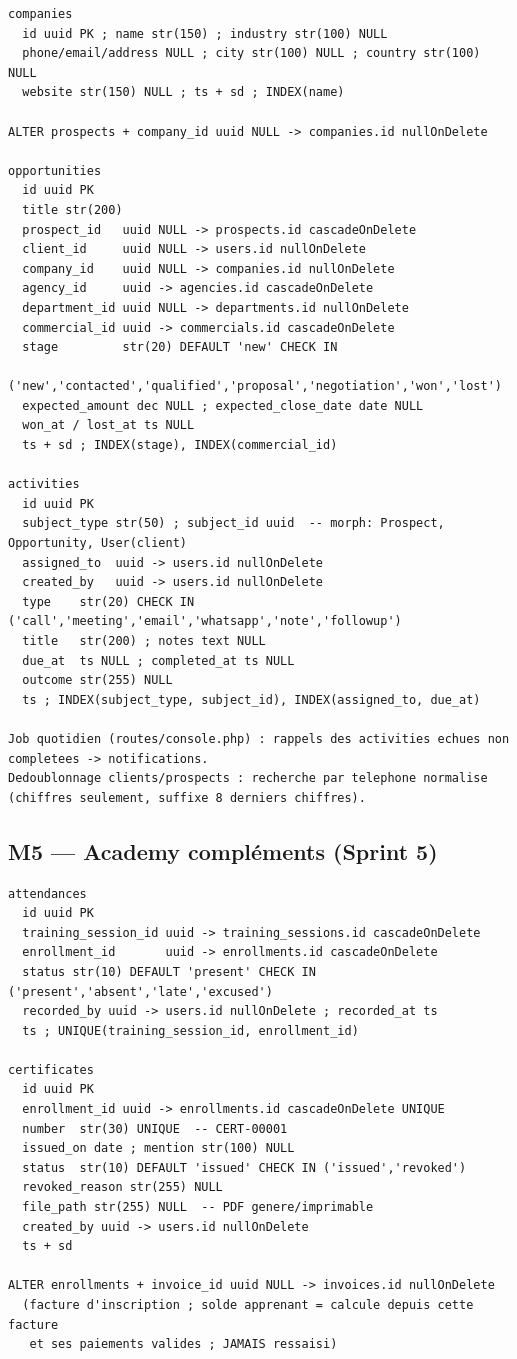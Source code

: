 \documentclass[11pt,a4paper]{article}
\begin{document}
\begin{lstlisting}
companies
  id uuid PK ; name str(150) ; industry str(100) NULL
  phone/email/address NULL ; city str(100) NULL ; country str(100) NULL
  website str(150) NULL ; ts + sd ; INDEX(name)

ALTER prospects + company_id uuid NULL -> companies.id nullOnDelete

opportunities
  id uuid PK
  title str(200)
  prospect_id   uuid NULL -> prospects.id cascadeOnDelete
  client_id     uuid NULL -> users.id nullOnDelete
  company_id    uuid NULL -> companies.id nullOnDelete
  agency_id     uuid -> agencies.id cascadeOnDelete
  department_id uuid NULL -> departments.id nullOnDelete
  commercial_id uuid -> commercials.id cascadeOnDelete
  stage         str(20) DEFAULT 'new' CHECK IN
                ('new','contacted','qualified','proposal','negotiation','won','lost')
  expected_amount dec NULL ; expected_close_date date NULL
  won_at / lost_at ts NULL
  ts + sd ; INDEX(stage), INDEX(commercial_id)

activities
  id uuid PK
  subject_type str(50) ; subject_id uuid  -- morph: Prospect, Opportunity, User(client)
  assigned_to  uuid -> users.id nullOnDelete
  created_by   uuid -> users.id nullOnDelete
  type    str(20) CHECK IN ('call','meeting','email','whatsapp','note','followup')
  title   str(200) ; notes text NULL
  due_at  ts NULL ; completed_at ts NULL
  outcome str(255) NULL
  ts ; INDEX(subject_type, subject_id), INDEX(assigned_to, due_at)

Job quotidien (routes/console.php) : rappels des activities echues non
completees -> notifications.
Dedoublonnage clients/prospects : recherche par telephone normalise
(chiffres seulement, suffixe 8 derniers chiffres).
\end{lstlisting}

\subsection{M5 --- Academy compléments (Sprint 5)}

\begin{lstlisting}
attendances
  id uuid PK
  training_session_id uuid -> training_sessions.id cascadeOnDelete
  enrollment_id       uuid -> enrollments.id cascadeOnDelete
  status str(10) DEFAULT 'present' CHECK IN ('present','absent','late','excused')
  recorded_by uuid -> users.id nullOnDelete ; recorded_at ts
  ts ; UNIQUE(training_session_id, enrollment_id)

certificates
  id uuid PK
  enrollment_id uuid -> enrollments.id cascadeOnDelete UNIQUE
  number  str(30) UNIQUE  -- CERT-00001
  issued_on date ; mention str(100) NULL
  status  str(10) DEFAULT 'issued' CHECK IN ('issued','revoked')
  revoked_reason str(255) NULL
  file_path str(255) NULL  -- PDF genere/imprimable
  created_by uuid -> users.id nullOnDelete
  ts + sd

ALTER enrollments + invoice_id uuid NULL -> invoices.id nullOnDelete
  (facture d'inscription ; solde apprenant = calcule depuis cette facture
   et ses paiements valides ; JAMAIS ressaisi)
\end{lstlisting}
\end{document}
